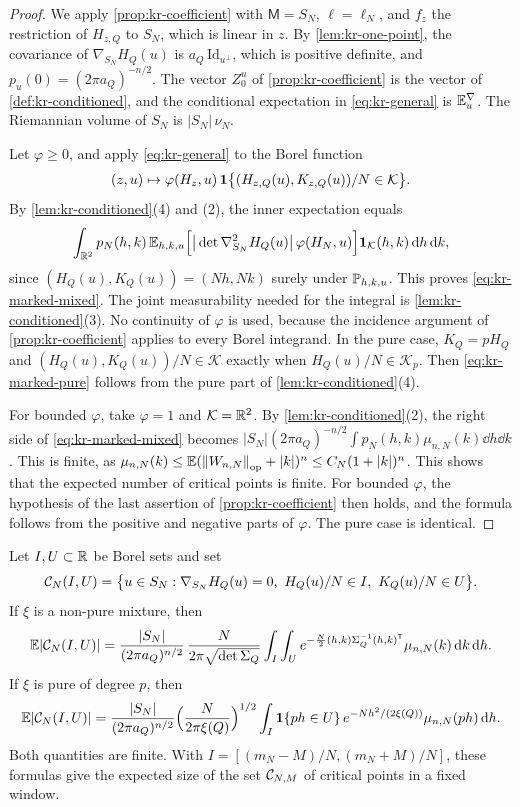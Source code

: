 \begin{proof}
We apply \cref{prop:kr-coefficient} with $\mathsf M=S_N$, $\ell=\ell_N$, and $f_z$ the restriction of $H_{z,Q}$ to $S_N$, which is linear in $z$. By \cref{lem:kr-one-point}, the covariance of $\nabla_{S_N}H_Q(u)$ is $a_Q\,\mathrm{Id}_{u^\perp}$, which is positive definite, and $p_u(0)=(2\pi a_Q)^{-n/2}$. The vector $Z^u_0$ of \cref{prop:kr-coefficient} is the vector of \cref{def:kr-conditioned}, and the conditional expectation in \eqref{eq:kr-general} is $\mathbb E^\nabla_u$. The Riemannian volume of $S_N$ is $|S_N|\,\nu_N$.

Let $\varphi\ge0$, and apply \eqref{eq:kr-general} to the Borel function
\[
(z,u)\mapsto\varphi(H_z,u)\,\mathbf 1\big\{(H_{z,Q}(u),K_{z,Q}(u))/N\in\mathcal K\big\}.
\]
By \cref{lem:kr-conditioned}(4) and (2), the inner expectation equals
\[
\int_{\mathbb R^2}p_N(h,k)\,\mathbb E_{h,k,u}\Big[\big|\det\nabla^2_{S_N}H_Q(u)\big|\,\varphi(H_N,u)\Big]\mathbf 1_{\mathcal K}(h,k)\,\mathrm d h\,\mathrm d k,
\]
since $(H_Q(u),K_Q(u))=(Nh,Nk)$ surely under $\mathbb P_{h,k,u}$. This proves \eqref{eq:kr-marked-mixed}. The joint measurability needed for the integral is \cref{lem:kr-conditioned}(3). No continuity of $\varphi$ is used, because the incidence argument of \cref{prop:kr-coefficient} applies to every Borel integrand. In the pure case, $K_Q=pH_Q$ and $(H_Q(u),K_Q(u))/N\in\mathcal K$ exactly when $H_Q(u)/N\in\mathcal K_p$. Then \eqref{eq:kr-marked-pure} follows from the pure part of \cref{lem:kr-conditioned}(4).

For bounded $\varphi$, take $\varphi=1$ and $\mathcal K=\mathbb R^2$. By \cref{lem:kr-conditioned}(2), the right side of \eqref{eq:kr-marked-mixed} becomes $|S_N|(2\pi a_Q)^{-n/2}\int p_N(h,k)\mu_{n,N}(k)\dd h\dd k$. This is finite, as $\mu_{n,N}(k)\le\mathbb E(\left\lVert W_{n,N}\right\rVert_{\rm op}+|k|)^n\le C_N(1+|k|)^n$. This shows that the expected number of critical points is finite. For bounded $\varphi$, the hypothesis of the last assertion of \cref{prop:kr-coefficient} then holds, and the formula follows from the positive and negative parts of $\varphi$. The pure case is identical.
\end{proof}

\begin{corollary}\label{cor:kr-count}
Let $I,U\subset\mathbb R$ be Borel sets and set
\[
\cC_N(I,U)=\big\{u\in S_N:\nabla_{S_N}H_Q(u)=0,\ H_Q(u)/N\in I,\ K_Q(u)/N\in U\big\}.
\]
If $\xi$ is a non-pure mixture, then
\begin{equation}\label{eq:kr-count-mixed}
\mathbb E|\mathcal C_N(I,U)|=\frac{|S_N|}{(2\pi a_Q)^{n/2}}\,\frac N{2\pi\sqrt{\det\Sigma_Q}}\int_I\int_Ue^{-\frac N2(h,k)\Sigma_Q^{-1}(h,k)^{\mathsf T}}\mu_{n,N}(k)\,\mathrm d k\,\mathrm d h.
\end{equation}
If $\xi$ is pure of degree $p$, then
\begin{equation}\label{eq:kr-count-pure}
\mathbb E|\mathcal C_N(I,U)|=\frac{|S_N|}{(2\pi a_Q)^{n/2}}\Big(\frac N{2\pi\xi(Q)}\Big)^{1/2}\int_I\mathbf 1\{ph\in U\}\,e^{-Nh^2/(2\xi(Q))}\mu_{n,N}(ph)\,\mathrm d h.
\end{equation}
Both quantities are finite. With $I=[(m_N-M)/N,(m_N+M)/N]$, these formulas give the expected size of the set $\mathcal C_{N,M}$ of critical points in a fixed window.
\end{corollary}

